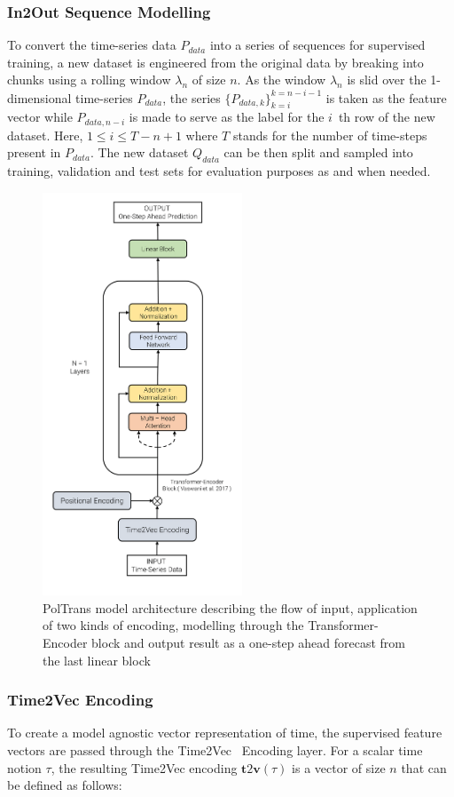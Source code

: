 \documentclass[10pt,journal]{IEEEtran}
\begin{document}
\subsubsection{In2Out Sequence Modelling}
To convert the time-series data ${P_{data}}$ into a series of sequences for supervised training, a new dataset is engineered from the original data by breaking into chunks using a rolling window ${\lambda_n}$ of size ${n}$. As the window ${\lambda_n}$ is slid over the 1-dimensional time-series ${P_{data}}$, the series $\{{P_{data, k}}\}^{k=n-i-1}_{k=i}$ is taken as the feature vector while ${P_{data, n-i}}$ is made to serve as the label for the ${i}$~th row of the new dataset. Here, ${1 \leq i \leq {T - n + 1}}$ where ${T}$ stands for the number of time-steps present in ${P_{data}}$. The new dataset ${Q_{data}}$ can be then split and sampled into training, validation and test sets for evaluation purposes as and when needed.

\begin{figure}[h]
\centering
\includegraphics[height=12cm]{../paper_figures/model-architecture.png}
\caption{{PolTrans} model architecture describing the flow of input, application of two kinds of encoding, modelling through the Transformer-Encoder block and output result as a one-step ahead forecast from the last linear block}
\label{fig:model-archi}
\end{figure}

\subsubsection{Time2Vec Encoding}
To create a model agnostic vector representation of time, the supervised feature vectors are passed through the Time2Vec~\cite{Kazemi.2019} Encoding layer. For a scalar time notion ${\tau}$, the resulting Time2Vec encoding ${\mathbf{t} 2 \mathbf{v}(\tau)}$ is a vector of size ${n}$ that can be defined as follows:
\end{document}

